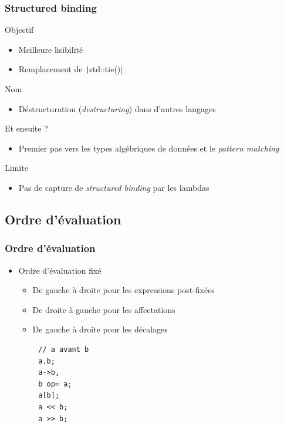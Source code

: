 \documentclass[C++.tex]{subfiles}
\begin{document}
\begin{frame}[fragile]
	\frametitle{Structured binding}
	\begin{block}{Objectif}
		\begin{itemize}
			\item Meilleure lisibilité
			\item Remplacement de \texttt|std::tie()|
		\end{itemize}
	\end{block}

	\begin{block}{Nom}
		\begin{itemize}
			\item Déstructuration (\textit{destructuring}) dans d'autres langages
		\end{itemize}
	\end{block}

	\begin{block}{Et ensuite ?}
		\begin{itemize}
			\item Premier pas vers les types algébriques de données et le \textit{pattern matching}
		\end{itemize}
	\end{block}


	\begin{alertblock}{Limite}
		\begin{itemize}
			\item Pas de capture de \textit{structured binding} par les lambdas
		\end{itemize}
	\end{alertblock}

\end{frame}

\subsection*{Ordre d'évaluation}
\begin{frame}[fragile]
	\frametitle{Ordre d'évaluation}
	\begin{itemize}
		\item Ordre d'évaluation fixé
		\begin{itemize}
			\item De gauche à droite pour les expressions post-fixées
			\item De droite à gauche pour les affectations
			\item De gauche à droite pour les décalages
		\end{itemize}
	\end{itemize}

	\begin{verbatim}
		// a avant b
		a.b;
		a->b,
		b op= a;
		a[b];
		a << b;
		a >> b;
	\end{verbatim}
\end{frame}
\end{document}
